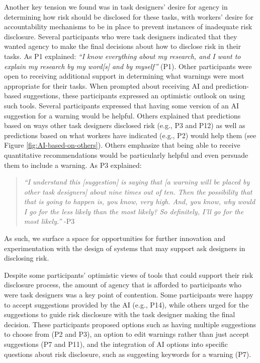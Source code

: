 Another key tension we found was in task designers' desire for agency in determining how risk should be disclosed for these tasks, with workers' desire for accountability mechanisms to be in place to prevent instances of inadequate risk disclosure. Several participants who were task designers indicated that they wanted agency to make the final decisions about how to disclose risk in their tasks. As P1 explained: \textit{``I know everything about my research, and I want to explain my research by my word[s] and by myself''} (P1). Other participants were open to receiving additional support in determining what warnings were most appropriate for their tasks. When prompted about receiving AI and prediction-based suggestions, these participants expressed an optimistic outlook on using such tools. Several participants expressed that having some version of an AI suggestion for a warning would be helpful. Others explained that predictions based on ways other task designers disclosed risk (e.g., P3 and P12) as well as predictions based on what workers have indicated (e.g., P2) would help them (see Figure \ref{fig:AI-based-on-others}). Others emphasize that being able to receive quantitative recommendations  would be particularly helpful and even persuade them to include a warning. As P3 explained:
\begin{quote}
    \textit{``I understand this [suggestion] is saying that [a warning will be placed by other task designers] about nine times out of ten. Then the possibility that that is going to happen is, you know, very high. And, you know, why would I go for the less likely than the most likely? So definitely, I'll go for the most likely.''} -P3
\end{quote}
As such, we surface a space for opportunities for further innovation and experimentation with the design of systems that may support ask designers in disclosing risk.

Despite some participants' optimistic views of tools that could support their risk disclosure process, the amount of agency that is afforded to participants who were task designers was a key point of contention. Some participants were happy to accept suggestions provided by the AI (e.g., P14), while others urged for the suggestions to guide risk disclosure with the task designer making the final decision. These participants proposed options such as having multiple suggestions to choose from (P2 and P3), an option to edit warnings rather than just accept suggestions (P7 and P11), and the integration of AI options into specific questions about risk disclosure, such as suggesting keywords for a warning (P7). 

